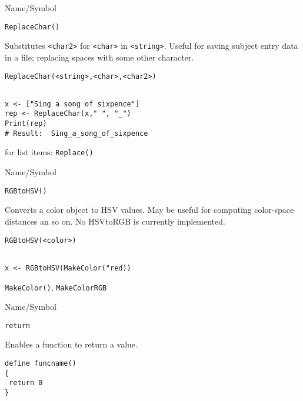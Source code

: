 \rl


\begin{desc}{Name/Symbol}
\item[Name/Symbol]  \verb+ReplaceChar()+

\item[Description]  	Substitutes  \verb+<char2>+ for \verb+<char>+
  in \verb+<string>+. Useful for saving subject entry data in a file;
  replacing spaces with some other character.

\item[Usage]        	
\begin{verbatim}
ReplaceChar(<string>,<char>,<char2>)
\end{verbatim}
			  
\item[Example]     	
\begin{verbatim}

x <- ["Sing a song of sixpence"]
rep <- ReplaceChar(x," ", "_")
Print(rep)
# Result:  Sing_a_song_of_sixpence
\end{verbatim}

\item[See Also]	
 for list items: \verb+Replace()+ 
\end{desc}

\rl


\begin{desc}{Name/Symbol}
\item[Name/Symbol]  \verb+RGBtoHSV()+

\item[Description]  Converts a color object to HSV values.  May be useful for computing color-space
distances an so on.  No HSVtoRGB is currently implemented.

\item[Usage]        	
\begin{verbatim}
RGBtoHSV(<color>)
\end{verbatim}
			  
\item[Example]     	
\begin{verbatim}

x <- RGBtoHSV(MakeColor("red))

\end{verbatim}

\item[See Also]	
   \verb+MakeColor()+, \verb+MakeColorRGB+
\end{desc}

\rl


\begin{desc}{Name/Symbol}
\item[Name/Symbol] 	\verb+return+

\item[Description]  	Enables a function to return a value.

\item[Usage]
\begin{verbatim}
define funcname()
{
 return 0
}
\end{verbatim}

\item[Example]	

\item[See Also]	
\end{desc}

